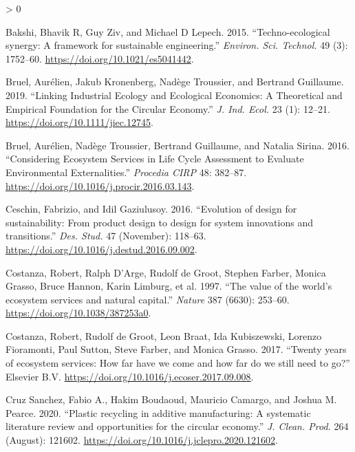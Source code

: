 \documentclass[
  14pt,
]{extarticle}
\newlength{\cslhangindent}
\newenvironment{CSLReferences}[2] %
 {%
  \setlength{\parindent}{0pt}
  \ifodd #1 \everypar{\setlength{\hangindent}{\cslhangindent}}\ignorespaces\fi
  \ifnum #2 > 0
  \setlength{\parskip}{#2\baselineskip}
  \fi
 }%
 {}
\begin{document}
\hypertarget{refs}{}
\begin{CSLReferences}{1}{0}
\leavevmode\hypertarget{ref-Bakshi2015}{}%
Bakshi, Bhavik R, Guy Ziv, and Michael D Lepech. 2015. {``{Techno-ecological synergy: A framework for sustainable engineering}.''} \emph{Environ. Sci. Technol.} 49 (3): 1752--60. \url{https://doi.org/10.1021/es5041442}.

\leavevmode\hypertarget{ref-Bruel2018}{}%
Bruel, Aurélien, Jakub Kronenberg, Nadège Troussier, and Bertrand Guillaume. 2019. {``{Linking Industrial Ecology and Ecological Economics: A Theoretical and Empirical Foundation for the Circular Economy}.''} \emph{J. Ind. Ecol.} 23 (1): 12--21. \url{https://doi.org/10.1111/jiec.12745}.

\leavevmode\hypertarget{ref-Bruel2016}{}%
Bruel, Aurélien, Nadège Troussier, Bertrand Guillaume, and Natalia Sirina. 2016. {``{Considering Ecosystem Services in Life Cycle Assessment to Evaluate Environmental Externalities}.''} \emph{Procedia CIRP} 48: 382--87. \url{https://doi.org/10.1016/j.procir.2016.03.143}.

\leavevmode\hypertarget{ref-Ceschin2016}{}%
Ceschin, Fabrizio, and Idil Gaziulusoy. 2016. {``{Evolution of design for sustainability: From product design to design for system innovations and transitions}.''} \emph{Des. Stud.} 47 (November): 118--63. \url{https://doi.org/10.1016/j.destud.2016.09.002}.

\leavevmode\hypertarget{ref-Costanza1997}{}%
Costanza, Robert, Ralph D'Arge, Rudolf de Groot, Stephen Farber, Monica Grasso, Bruce Hannon, Karin Limburg, et al. 1997. {``{The value of the world's ecosystem services and natural capital}.''} \emph{Nature} 387 (6630): 253--60. \url{https://doi.org/10.1038/387253a0}.

\leavevmode\hypertarget{ref-Costanza2017}{}%
Costanza, Robert, Rudolf de Groot, Leon Braat, Ida Kubiszewski, Lorenzo Fioramonti, Paul Sutton, Steve Farber, and Monica Grasso. 2017. {``{Twenty years of ecosystem services: How far have we come and how far do we still need to go?}''} Elsevier B.V. \url{https://doi.org/10.1016/j.ecoser.2017.09.008}.

\leavevmode\hypertarget{ref-CruzSanchez2020}{}%
Cruz Sanchez, Fabio A., Hakim Boudaoud, Mauricio Camargo, and Joshua M. Pearce. 2020. {``{Plastic recycling in additive manufacturing: A systematic literature review and opportunities for the circular economy}.''} \emph{J. Clean. Prod.} 264 (August): 121602. \url{https://doi.org/10.1016/j.jclepro.2020.121602}.


\end{CSLReferences}
\end{document}
